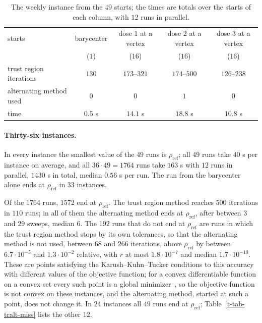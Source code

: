 \documentclass[11pt]{article}
\theoremstyle{plain}
\theoremstyle{definition}
\theoremstyle{remark}
\numberwithin{equation}{section}
\numberwithin{figure}{section}
\numberwithin{table}{section}
\numberwithin{algorithm}{section}
\begin{document}
\begin{table}[ht]
\centering
\small
\begin{tabular}{lcccc}
\hline
starts & barycenter & dose $1$ at a vertex & dose $2$ at a vertex & dose $3$ at a vertex\\
 & ($1$) & ($16$) & ($16$) & ($16$)\\
\hline
trust region iterations & $130$ & $173$--$321$ & $174$--$500$ & $126$--$238$\\
alternating method used & $0$ & $0$ & $1$ & $0$\\
time & $0.5$ s & $14.1$ s & $18.8$ s & $10.8$ s\\
\hline
\end{tabular}
\caption{The weekly instance from the $49$ starts; the times are totals over
the starts of each column, with $12$ runs in parallel.}\label{t-tab-tralt}
\end{table}

\paragraph{Thirty-six instances.} In every instance the smallest value of the
$49$ runs is $\rho_{\mathrm{ref}}$; all $49$ runs take $40$ s per instance on
average, and all $36\cdot 49=1764$ runs take $163$ s with $12$ runs in
parallel, $1430$ s in total, median $0.56$ s per run. The run from the
barycenter alone ends at $\rho_{\mathrm{ref}}$ in $33$ instances.

Of the $1764$ runs, $1572$ end at $\rho_{\mathrm{ref}}$. The trust region
method reaches $500$ iterations in $110$ runs; in all of them the alternating
method ends at $\rho_{\mathrm{ref}}$, after between $3$ and $29$ sweeps,
median $6$. The $192$ runs that do not end at $\rho_{\mathrm{ref}}$ are runs in
which the trust region method stops by its own tolerances, so that the
alternating method is not used, between $68$ and $266$ iterations, above $\rho_{\mathrm{ref}}$
by between $6.7\cdot 10^{-5}$ and $1.3\cdot 10^{-2}$ relative, with $r$ at most
$1.8\cdot 10^{-7}$ and median $1.7\cdot 10^{-10}$. These are points satisfying
the Karush--Kuhn--Tucker conditions to this accuracy with different values of
the objective function; for a convex differentiable function on a convex set
every such point is a global minimizer~\cite[Section 4.2.3]{2004Boyd_Vandenberghe},
so the objective function is not convex on these instances, and the
alternating method, started at such a point, does not change it. In $24$
instances all $49$ runs end at $\rho_{\mathrm{ref}}$;
Table~\ref{t-tab-tralt-miss} lists the other $12$.
\end{document}
